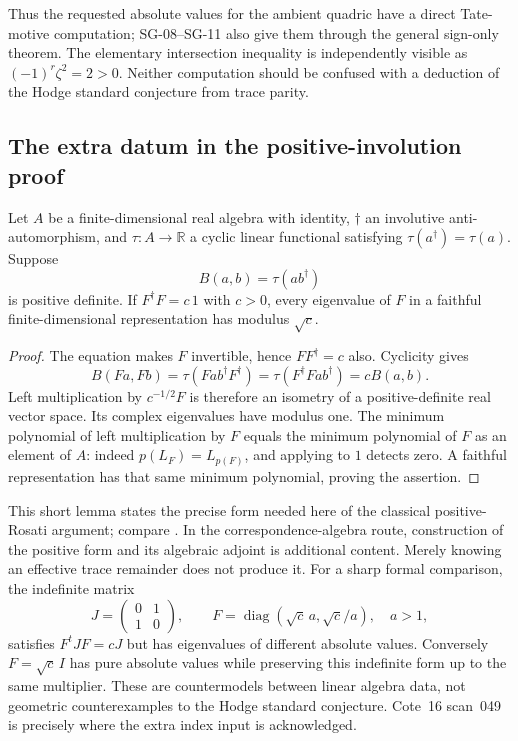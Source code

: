 Thus the requested absolute values for the ambient quadric have a direct Tate-motive computation; SG-08--SG-11 also give them through the general sign-only theorem. The elementary intersection inequality is independently visible as $(-1)^r\zeta^2=2>0$. Neither computation should be confused with a deduction of the Hodge standard conjecture from trace parity.

\subsection{The extra datum in the positive-involution proof}

\begin{lemma}
Let $A$ be a finite-dimensional real algebra with identity, $\dagger$ an involutive anti-automorphism, and $\tau:A\to\mathbb R$ a cyclic linear functional satisfying $\tau(a^\dagger)=\tau(a)$. Suppose
\[
 B(a,b)=\tau(ab^\dagger)
\]
is positive definite. If $F^\dagger F=c\,1$ with $c>0$, every eigenvalue of $F$ in a faithful finite-dimensional representation has modulus $\sqrt c$.
\end{lemma}

\begin{proof}
The equation makes $F$ invertible, hence $FF^\dagger=c$ also. Cyclicity gives
\[
 B(Fa,Fb)=\tau(Fab^\dagger F^\dagger)
        =\tau(F^\dagger F ab^\dagger)=cB(a,b).
\]
Left multiplication by $c^{-1/2}F$ is therefore an isometry of a positive-definite real vector space. Its complex eigenvalues have modulus one. The minimum polynomial of left multiplication by $F$ equals the minimum polynomial of $F$ as an element of $A$: indeed $p(L_F)=L_{p(F)}$, and applying to $1$ detects zero. A faithful representation has that same minimum polynomial, proving the assertion.
\end{proof}

This short lemma states the precise form needed here of the classical positive-Rosati argument; compare \cite[Th.~13.2 and Lemmas~14.2--14.3]{MilneAV}. In the correspondence-algebra route, construction of the positive form and its algebraic adjoint is additional content. Merely knowing an effective trace remainder does not produce it. For a sharp formal comparison, the indefinite matrix
\[
 J=\begin{pmatrix}0&1\\1&0\end{pmatrix},\qquad
 F=\operatorname{diag}(\sqrt c\,a,\sqrt c/a),\quad a>1,
\]
satisfies $F^tJF=cJ$ but has eigenvalues of different absolute values. Conversely $F=\sqrt c\,I$ has pure absolute values while preserving this indefinite form up to the same multiplier. These are countermodels between linear algebra data, not geometric counterexamples to the Hodge standard conjecture. Cote~16 scan~049 is precisely where the extra index input is acknowledged.

